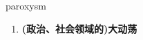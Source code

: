 
\begin{frame}
{\huge paroxysm}
\begin{center}
\begin{enumerate}\Large
  \item \textbf{(政治、社会领域的)大动荡}
\end{enumerate}
\end{center}
\end{frame}
